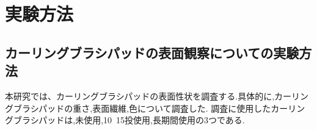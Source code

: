 \documentclass[main]{subfiles}
\begin{document}
\chapter{実験方法}
\section{カーリングブラシパッドの表面観察についての実験方法}
本研究では、カーリングブラシパッドの表面性状を調査する.具体的に,カーリングブラシパッドの重さ,表面繊維,色について調査した.
調査に使用したカーリングブラシパッドは,未使用,10~15投使用,長期間使用の3つである.
\end{document}
